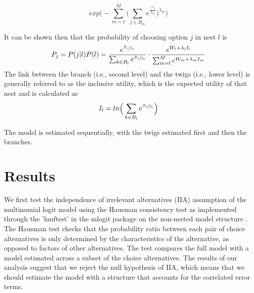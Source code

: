 \documentclass[10pt]{amsart}
\begin{document}
\begin{equation}\label{nestederror}
exp\Big(- \sum_{m=1}^{M} \Big(\sum_{j\in B_m} e^{\frac{-\epsilon_j}{\lambda_m}} \Big)^{\lambda_m} \Big)
\end{equation} 

It can be shown then that the probability of choosing option $j$ in nest $l$ is 
\begin{equation}\label{nestedstructure}
P_j = P(j | l)P(l) = \frac{e^{\sfrac{{Z_j}}{\lambda_l}}}{\sum_{k\in B_l}e^{\sfrac{Z_k}{\lambda_l}}} \cdot \frac{e^{W_l+\lambda_l I_l}}{\sum_{m=l}^M e^{W_m+\lambda_m I_m}}
\end{equation}
The link between the branch (i.e., second level) and the twigs (i.e., lower level) is generally referred to as the inclusive utility, which is the expected utility of that nest and is calculated as 
\begin{equation}
I_l = ln\Big(\sum_{k\in B_l} e^{\sfrac{Z_k}{\lambda_l}}\Big)\end{equation}

The model is estimated sequentially, with the twigs estimated first and then the branches.  

\section{Results}
We first test the independence of irrelevant alternatives (IIA) assumption of the multinomial logit model using the Hausman consistency test as implemented through the 'hmftest' in the mlogit package on the non-nested model structure \parencite{mlogit2013}. 
The Hausman test checks that the probability ratio between each pair of choice alternatives is only determined by the characteristics of the alternative, as opposed to factors of other alternatives. 
The test compares the full model with a model estimated across a subset of the choice alternatives.
The results of our analysis suggest that we reject the null hypothesis of IIA, which means that we should estimate the model with a structure that accounts for the correlated error terms.  
  
\end{document}

